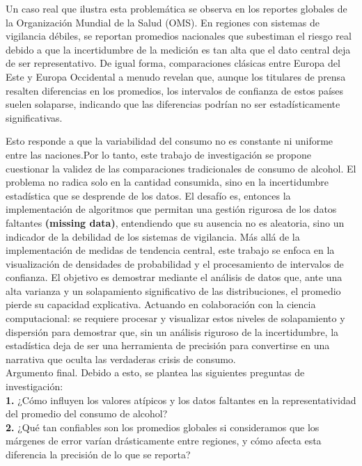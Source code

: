 \documentclass[oneside,11pt]{Latex/Classes/PhDthesisPSnPDF}
\begin{document}
Un caso real que ilustra esta problemática se observa en los reportes
globales de la Organización Mundial de la Salud (OMS). En regiones con
sistemas de vigilancia débiles, se reportan promedios nacionales que
subestiman el riesgo real debido a que la incertidumbre de la medición
es tan alta que el dato central deja de ser representativo. De igual
forma, comparaciones clásicas entre Europa del Este y Europa Occidental
a menudo revelan que, aunque los titulares de prensa resalten
diferencias en los promedios, los intervalos de confianza de estos
países suelen solaparse, indicando que las diferencias podrían no ser
estadísticamente significativas.

Esto responde a que la variabilidad del consumo no es constante ni
uniforme entre las naciones.Por lo tanto, este trabajo de investigación
se propone cuestionar la validez de las comparaciones tradicionales de
consumo de alcohol. El problema no radica solo en la cantidad consumida,
sino en la incertidumbre estadística que se desprende de los datos. El
desafío es, entonces la implementación de algoritmos que permitan una
gestión rigurosa de los datos faltantes \textbf{(missing data)},
entendiendo que su ausencia no es aleatoria, sino un indicador de la
debilidad de los sistemas de vigilancia. Más allá de la implementación
de medidas de tendencia central, este trabajo se enfoca en la
visualización de densidades de probabilidad y el procesamiento de
intervalos de confianza. El objetivo es demostrar mediante el análisis
de datos que, ante una alta varianza y un solapamiento significativo de
las distribuciones, el promedio pierde su capacidad explicativa.
Actuando en colaboración con la ciencia computacional: se requiere
procesar y visualizar estos niveles de solapamiento y dispersión para
demostrar que, sin un análisis riguroso de la incertidumbre, la
estadística deja de ser una herramienta de precisión para convertirse en
una narrativa que oculta las verdaderas crisis de consumo.\\

Argumento final. Debido a esto, se plantea las siguientes preguntas de
investigación:\\

\textbf{1.} ¿Cómo influyen los valores atípicos y los datos faltantes en
la representatividad del promedio del consumo de alcohol?\\

\textbf{2.} ¿Qué tan confiables son los promedios globales si
consideramos que los márgenes de error varían drásticamente entre
regiones, y cómo afecta esta diferencia la precisión de lo que se
reporta?\\
\end{document}
